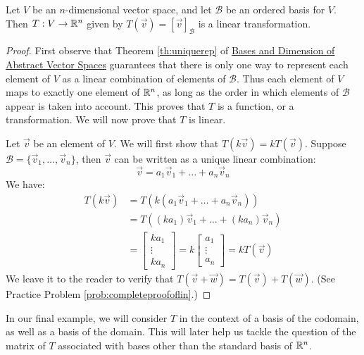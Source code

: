 \documentclass{ximera}
\begin{document}
\begin{theorem}\label{th:coordvectmappinglinear}
Let $V$ be an $n$-dimensional vector space, and let $\mathcal{B}$ be an ordered basis for $V$.  Then  $T:V\rightarrow \mathbb{R}^n$ given by $T(\vec{v})=[\vec{v}]_{\mathcal{B}}$ is a linear transformation.
\end{theorem}
\begin{proof}
First observe that Theorem \ref{th:uniquerep} of \href{\xmbaseurl/VSP-0060/main}{Bases and Dimension of Abstract Vector Spaces} guarantees that there is only one way to represent each element of $V$ as a linear combination of elements of $\mathcal{B}$.  Thus each element of $V$ maps to exactly one element of $\mathbb{R}^n$, as long as the order in which elements of $\mathcal{B}$ appear is taken into account.  This proves that $T$ is a function, or a transformation.  We will now prove that $T$ is linear.

Let $\vec{v}$ be an element of $V$.  We will first show that $T(k\vec{v})=kT(\vec{v})$.  Suppose $\mathcal{B}=\{\vec{v}_1, \ldots ,\vec{v}_n\}$, then $\vec{v}$ can be written as a unique linear combination:
$$\vec{v}=a_1\vec{v}_1+ \ldots +a_n\vec{v}_n$$
We have:
\begin{align*}
    T(k\vec{v})&=T(k(a_1\vec{v}_1+ \ldots +a_n\vec{v}_n))\\
    &=T((ka_1)\vec{v}_1+ \ldots +(ka_n)\vec{v}_n)\\
    &=\begin{bmatrix}ka_1\\\vdots\\ka_n\end{bmatrix}=k\begin{bmatrix}a_1\\\vdots\\a_n\end{bmatrix}=kT(\vec{v})
\end{align*}
We leave it to the reader to verify that $T(\vec{v}+\vec{w})=T(\vec{v})+T(\vec{w})$.  (See Practice Problem \ref{prob:completeproofoflin}.)
\end{proof}

In our final example, we will consider $T$ in the context of a basis of the codomain, as well as a basis of the domain.  This will later help us tackle the question of the matrix of $T$ associated with bases other than the standard basis of $\mathbb{R}^n$.
\end{document}
